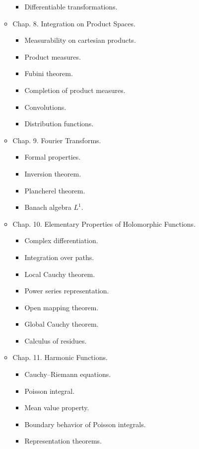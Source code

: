 \documentclass{article}
\begin{document}
\begin{itemize}
\begin{itemize}
\begin{itemize}
			\item {\sf Differentiable transformations.}
		\end{itemize}
		\item {\sf Chap. 8. Integration on Product Spaces.}
		\begin{itemize}
			\item {\sf Measurability on cartesian products.}
			\item {\sf Product measures.}
			\item {\sf Fubini theorem.}
			\item {\sf Completion of product measures.}
			\item {\sf Convolutions.}
			\item {\sf Distribution functions.}
		\end{itemize}
		\item {\sf Chap. 9. Fourier Transforms.}
		\begin{itemize}
			\item {\sf Formal properties.}
			\item {\sf Inversion theorem.}
			\item {\sf Plancherel theorem.}
			\item {\sf Banach algebra $L^1$.}
		\end{itemize}
		\item {\sf Chap. 10. Elementary Properties of Holomorphic Functions.}
		\begin{itemize}
			\item {\sf Complex differentiation.}
			\item {\sf Integration over paths.}
			\item {\sf Local Cauchy theorem.}
			\item {\sf Power series representation.}
			\item {\sf Open mapping theorem.}
			\item {\sf Global Cauchy theorem.}
			\item {\sf Calculus of residues.}
		\end{itemize}
		\item {\sf Chap. 11. Harmonic Functions.}
		\begin{itemize}
			\item {\sf Cauchy--Riemann equations.}
			\item {\sf Poisson integral.}
			\item {\sf Mean value property.}
			\item {\sf Boundary behavior of Poisson integrals.}
			\item {\sf Representation theorems.}

\end{itemize}
\end{itemize}
\end{itemize}
\end{document}
